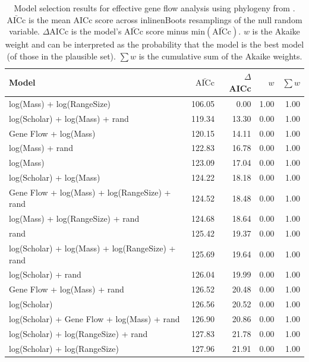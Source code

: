 \begin{table}[ht]
\centering
\caption[
  Full model selection results for effective gene flow analysis. 
]{
  Model selection results for effective gene flow analysis using phylogeny from \cite{jones2005bats}. 
  $\bar{\text{AICc}}$ is the mean AICc score across 
inline{nBoots} resamplings of the null random variable. 
  $\Delta$AICc is the model's $\bar{\text{AICc}}$ score minus $\text{min}(\bar{\text{AICc}})$. 
  $w$ is the Akaike weight and can be interpreted as the probability that the model is the best model (of those in the plausible set).
  $\sum w$ is the cumulative sum of the Akaike weights.
  } 
\label{A-fstModelWeights2}
\begingroup\scriptsize
\begin{tabular}{@{}lrrrr@{}}
  \toprule
Model & $\bar{\text{AICc}}$ & $\Delta$AICc & $w$ & $\sum w$ \\ 
  \midrule
log(Mass) + log(RangeSize) & 106.05 & 0.00 & 1.00 & 1.00 \\ 
  log(Scholar) + log(Mass) + rand & 119.34 & 13.30 & 0.00 & 1.00 \\ 
  Gene Flow + log(Mass) & 120.15 & 14.11 & 0.00 & 1.00 \\ 
  log(Mass) + rand & 122.83 & 16.78 & 0.00 & 1.00 \\ 
  log(Mass) & 123.09 & 17.04 & 0.00 & 1.00 \\ 
  log(Scholar) + log(Mass) & 124.22 & 18.18 & 0.00 & 1.00 \\ 
  Gene Flow + log(Mass) + log(RangeSize) + rand & 124.52 & 18.48 & 0.00 & 1.00 \\ 
  log(Mass) + log(RangeSize) + rand & 124.68 & 18.64 & 0.00 & 1.00 \\ 
  rand & 125.42 & 19.37 & 0.00 & 1.00 \\ 
  log(Scholar) + log(Mass) + log(RangeSize) + rand & 125.69 & 19.64 & 0.00 & 1.00 \\ 
  log(Scholar) + rand & 126.04 & 19.99 & 0.00 & 1.00 \\ 
  Gene Flow + log(Mass) + rand & 126.52 & 20.48 & 0.00 & 1.00 \\ 
  log(Scholar) & 126.56 & 20.52 & 0.00 & 1.00 \\ 
  log(Scholar) + Gene Flow + log(Mass) + rand & 126.90 & 20.86 & 0.00 & 1.00 \\ 
  log(Scholar) + log(RangeSize) + rand & 127.83 & 21.78 & 0.00 & 1.00 \\ 
  log(Scholar) + log(RangeSize) & 127.96 & 21.91 & 0.00 & 1.00 \\ 

\end{tabular}
\end{table}
